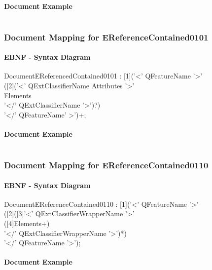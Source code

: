 \documentclass[11pt,a4paper]{article}
\begin{document}
\paragraph{Document Example}
\inputminted[fontsize=\footnotesize]{xml}{examples/EReferenceContained0100.xml}

\subsubsection{Document Mapping for EReferenceContained0101}
\paragraph{EBNF - Syntax Diagram}
\begin{rail}
DocumentEReferencedContained0101 : [1]('<' QFeatureName '>' \\
([2]('<' QExtClassifierName  Attributes '>' \\
Elements \\
'</' QExtClassifierName  '>')?)\\
'</' QFeatureName' >')+; 
\end{rail}
\paragraph{Document Example}
\inputminted[fontsize=\footnotesize]{xml}{examples/EReferenceContained0101.xml}

\subsubsection{Document Mapping for EReferenceContained0110}
\paragraph{EBNF - Syntax Diagram}
\begin{rail}
DocumentEReferenceContained0110 : [1]('<' QFeatureName '>'  \\
([2]([3]'<' QExtClassifierWrapperName  '>'\\
([4]Elements+) \\
'</' QExtClassifierWrapperName  '>')*) \\
'</' QFeatureName '>'); 
\end{rail}
\paragraph{Document Example}
\inputminted[fontsize=\footnotesize]{xml}{examples/EReferenceContained0110.xml}
\end{document}
